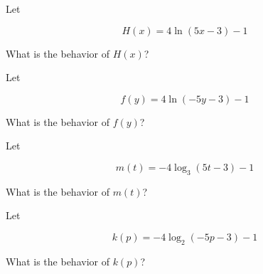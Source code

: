 \documentclass{ximera}
\author{Lee Wayand}
\begin{document}
\begin{exercise}


\begin{question}



Let 

\[
H(x) = 4 \ln(5x - 3) - 1
\]


What is the behavior of $H(x)$? 


\begin{multipleChoice}
\end{multipleChoice}

\end{question}







\begin{question}



Let 

\[
f(y) = 4 \ln(-5y - 3) - 1
\]


What is the behavior of $f(y)$? 


\begin{multipleChoice}
\end{multipleChoice}

\end{question}





\begin{question}



Let 

\[
m(t) = -4 \log_3 (5t - 3) - 1
\]


What is the behavior of $m(t)$? 


\begin{multipleChoice}
\end{multipleChoice}

\end{question}








\begin{question}



Let 

\[
k(p) = -4 \log_2 (-5p - 3) - 1
\]


What is the behavior of $k(p)$? 


\begin{multipleChoice}
\end{multipleChoice}

\end{question}








\end{exercise}
\end{document}
